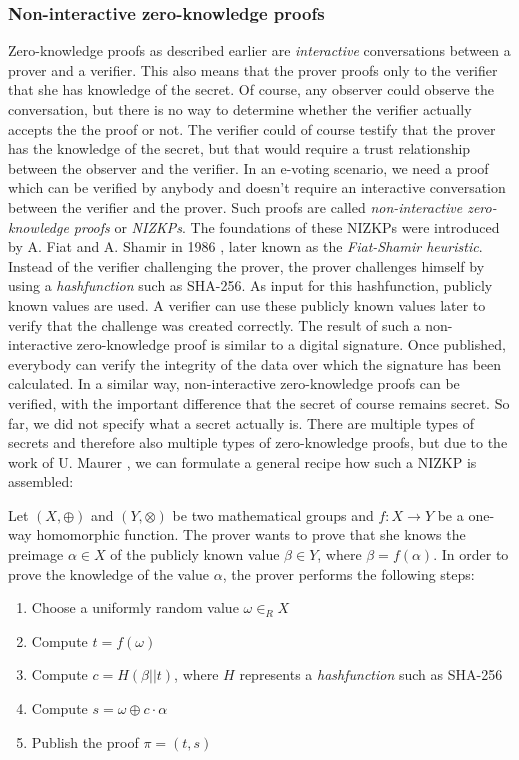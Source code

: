 \documentclass[numbers=noenddot, abstract=on, a4paper, headsepline,
footsepline, oneside, draft=off]{scrreprt}
\begin{document}
\subsubsection{Non-interactive zero-knowledge proofs}
\label{sec:nizkp}
Zero-knowledge proofs as described earlier are \textit{interactive}
conversations between a prover and a verifier. This also means that the prover
proofs only to the verifier that she has knowledge of the secret. Of course, any
observer could observe the conversation, but there is no way to determine
whether the verifier actually accepts the the proof or not. The verifier could
of course testify that the prover has the knowledge of the secret, but that
would require a trust relationship between the observer and the verifier. In an
e-voting scenario, we need a proof which can be verified by anybody and doesn't
require an interactive conversation between the verifier and the prover. Such
proofs are called \textit{non-interactive zero-knowledge proofs} or
\textit{NIZKPs}. The foundations of these NIZKPs were introduced by A. Fiat and
A. Shamir in 1986 \cite{FS87}, later known as the \textit{Fiat-Shamir
heuristic}. Instead of the verifier challenging the prover, the prover
challenges himself by using a \emph{hashfunction} such as SHA-256. As input for
this hashfunction, publicly known values are used. A verifier can use these
publicly known values later to verify that the challenge was created correctly.
The result of such a non-interactive zero-knowledge proof is similar to a
digital signature. Once published, everybody can verify the integrity of the
data over which the signature has been calculated. In a similar way,
non-interactive zero-knowledge proofs can be verified, with the important
difference that the secret of course remains secret. So far, we did not specify
what a secret actually is. There are multiple types of secrets and therefore
also multiple types of zero-knowledge proofs, but due to the work of U. Maurer
\cite{Maurer09}, we can formulate a general recipe how such a NIZKP is
assembled:

Let $(X,\oplus)$ and $(Y,\otimes)$ be two mathematical groups and
$f:X \rightarrow Y$ be a one-way homomorphic function. The prover wants to prove
that she knows the preimage $\alpha \in X$ of the publicly known value $\beta \in
Y$, where $\beta=f(\alpha)$. In order to prove the knowledge of the value
$\alpha$, the prover performs the following steps:
\begin{enumerate}
  \item Choose a uniformly random value $\omega \in_R X$
  \item Compute $t=f(\omega)$
  \item Compute $c=H(\beta||t)$, where $H$ represents a \emph{hashfunction} such
  as SHA-256
  \item Compute $s=\omega \oplus c \cdot \alpha$
  \item Publish the proof $\pi = (t,s)$
\end{enumerate}
\end{document}
